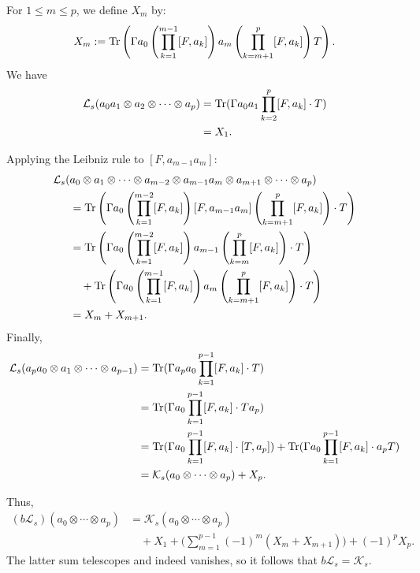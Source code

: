     For $1\leq m\leq p$, we define $X_m$ by:
    \begin{equation*}
        X_m := {\rm Tr}\left(\Gamma a_0\left(\prod_{k=1}^{m-1}[F,a_k]\right)a_m\left(\prod_{k=m+1}^p[F,a_k]\right) T\right).
    \end{equation*}
    We have
    \begin{align*}
        \mathcal{L}_s(a_0a_1\otimes a_2\otimes\cdots\otimes a_p) &= {\rm Tr}(\Gamma a_0a_1\prod_{k=2}^p[F,a_k]\cdot T)\\
                                                         &=X_1.
    \end{align*}
    
    Applying the Leibniz rule to $[F,a_{m-1}a_m]$:
    \begin{align*}
        \mathcal{L}_s(&a_0\otimes a_1\otimes\cdots\otimes a_{m-2}\otimes a_{m-1}a_m\otimes a_{m+1}\otimes\cdots\otimes a_p)\\
              &= {\rm Tr}\left(\Gamma a_0\left(\prod_{k=1}^{m-2}[F,a_k]\right)[F,a_{m-1}a_m]\left(\prod_{k=m+1}^p[F,a_k]\right)\cdot T\right)\\
              &= {\rm Tr}\left(\Gamma a_0\left(\prod_{k=1}^{m-2}[F,a_k]\right) a_{m-1}\left(\prod_{k=m}^p[F,a_k]\right)\cdot T\right)\\
              &\quad +{\rm Tr}\left(\Gamma a_0\left(\prod_{k=1}^{m-1}[F,a_k]\right)a_m\left(\prod_{k=m+1}^p[F,a_k]\right)\cdot T\right)\\
              &= X_m+X_{m+1}.
    \end{align*}
    Finally,
    \begin{align*}
        \mathcal{L}_s(a_pa_0\otimes a_1\otimes\cdots\otimes a_{p-1}) &= {\rm Tr}(\Gamma a_pa_0\prod_{k=1}^{p-1}[F,a_k]\cdot T)\\
                                                             &= {\rm Tr}(\Gamma a_0\prod_{k=1}^{p-1}[F,a_k]\cdot Ta_p)\\
                                                             &= {\rm Tr}(\Gamma a_0\prod_{k=1}^{p-1}[F,a_k]\cdot [T,a_p])+{\rm Tr}(\Gamma a_0\prod_{k=1}^{p-1}[F,a_k]\cdot a_pT)\\
                                                             &= \mathcal{K}_s(a_0\otimes\cdots\otimes a_p)+X_p.
    \end{align*}

    Thus,
    \begin{align*}
        (b\mathcal{L}_s)(a_0\otimes\cdots\otimes a_p) &= \mathcal{K}_s(a_0\otimes\cdots\otimes a_p)\\
                                              &\quad+ X_1 +\Big(\sum_{m=1}^{p-1}(-1)^m(X_m+X_{m+1})\Big)+(-1)^pX_p.
    \end{align*}
    The latter sum telescopes and indeed vanishes, so it follows that $b\mathcal{L}_s=\mathcal{K}_s.$


